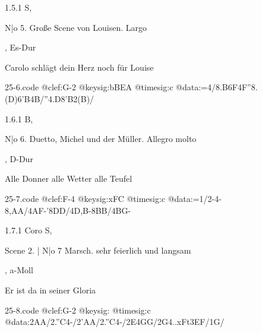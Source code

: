 \documentclass[a4paper, twocolumn, 11pt]{book}
\begin{document}
\newline %
\par 1.5.1  S, \begin{itshape}N|o 5. Große Scene von Louisen. Largo\end{itshape}, Es-Dur\newline \begin{footnotesize} Carolo schlägt dein Herz noch für Louise \end{footnotesize}  
\begin{filecontents*}{25-6.code}
@clef:G-2
@keysig:bBEA
@timesig:c
@data:=4/{8.B6F}4F''{8.(D)6'B}4B/''4.D8'B2(B)/
\end{filecontents*}
\newline %
\par 1.6.1  B, \begin{itshape}N|o 6. Duetto, Michel und der Müller. Allegro molto\end{itshape}, D-Dur\newline \begin{footnotesize} Alle Donner alle Wetter alle Teufel \end{footnotesize}  
\begin{filecontents*}{25-7.code}
@clef:F-4
@keysig:xFC
@timesig:c
@data:=1/2-4-8,AA/4AF-'8DD/4D,B-8BB/4BG-
\end{filecontents*}
\newline %
\par 1.7.1  Coro S, \begin{itshape}Scene 2. | N|o 7 Marsch. sehr feierlich und langsam\end{itshape}, a-Moll\newline \begin{footnotesize} Er ist da in seiner Gloria \end{footnotesize}  
\begin{filecontents*}{25-8.code}
@clef:G-2
@keysig:
@timesig:c
@data:2AA/2.''C4-/2'AA/2.''C4-/2E4GG/2G4..xFt{3EF}/1G/
\end{filecontents*}
\end{document}
